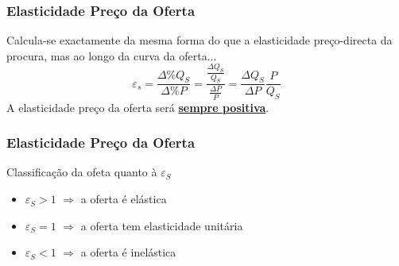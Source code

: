 \begin{frame}
	\frametitle{Elasticidade Pre\c co da Oferta}
	Calcula-se exactamente da mesma forma do que a elasticidade pre\c co-directa da procura, mas ao longo da curva da oferta...
	\[\varepsilon_s=\frac{\Delta\%Q_S}{\Delta\%P}=\frac{\frac{\Delta Q_S}{Q_S}}{\frac{\Delta P}{P}}=\frac{\Delta Q_S}{\Delta P}\frac{P}{Q_S}\]
	A elasticidade pre\c co da oferta ser\'a \underline{\textbf{sempre positiva}}.

\end{frame}

\begin{frame}
	\frametitle{Elasticidade Pre\c co da Oferta}
	Classifica\c c\~ao da ofeta quanto \`a $\varepsilon_S$
	\begin{itemize}
		\item $\varepsilon_S>1$ $\Rightarrow$ a oferta \'e el\'astica
		\item $\varepsilon_S=1$ $\Rightarrow$ a oferta tem elasticidade unit\'aria
		\item $\varepsilon_S<1$ $\Rightarrow$ a oferta \'e inel\'astica
	\end{itemize}
\end{frame}



